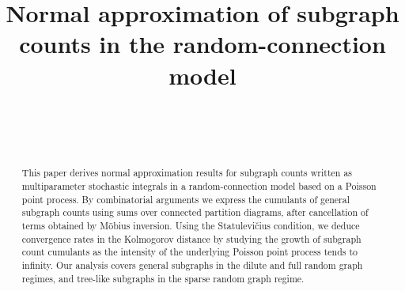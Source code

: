 \documentclass[bj,authoryear,noshowframe]{imsart}
\theoremstyle{plain}
\theoremstyle{remark}
\begin{document}
\begin{frontmatter}
\title{Normal approximation of subgraph counts in the random-connection model}

\begin{aug}
\author[A]{~}
\author[B]{~} 
\address[A]{Division of Mathematical Sciences, School of Physical and Mathematical Sciences, Nanyang Technological University, 21 Nanyang Link, Singapore 637371}

\address[B]{Division of Mathematical Sciences, School of Physical and Mathematical Sciences, Nanyang Technological University, 21 Nanyang Link, Singapore 637371}
\end{aug}

\begin{abstract}
  This paper derives normal approximation results for subgraph counts written as multiparameter stochastic integrals in a random-connection model based on a Poisson point process. By combinatorial arguments we express the cumulants of general subgraph counts using sums over connected partition diagrams, after cancellation of terms obtained by M\"obius inversion. Using the Statulevi\v{c}ius condition, we deduce convergence rates in the Kolmogorov distance by studying the growth of subgraph count cumulants as the intensity of the underlying Poisson point process tends to infinity. Our analysis covers general subgraphs in the dilute and full random graph regimes, and tree-like subgraphs in the sparse random graph regime.
\end{abstract}

\begin{keyword}
\end{keyword}

\end{frontmatter}
\end{document}
